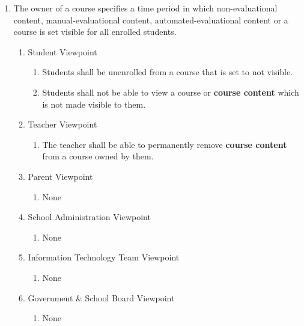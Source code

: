 \documentclass[]{article}
\begin{document}
\begin{enumerate}[{BE}1.]
\begin{enumerate}[{VP2}.1]
	\end{enumerate}

  \item The owner of a course specifies a time period in which non-evaluational
    content, manual-evaluational content, automated-evaluational content or a
    course is set visible for all enrolled students.
	\begin{enumerate}[{VP2}.1]

		\item Student Viewpoint
			\begin{enumerate}
        \item Students shall be unenrolled from a course that is set to not
          visible.

        \item Students shall not be able to view a course or
          \textbf{course content} which is not made visible to them.
			\end{enumerate}

		\item Teacher Viewpoint
			\begin{enumerate}
        \item The teacher shall be able to permanently remove \textbf{course
          content} from a course owned by them.
			\end{enumerate}

		\item Parent Viewpoint
			\begin{enumerate}
				\item None
			\end{enumerate}

		\item School Administration Viewpoint
			\begin{enumerate}
				\item None
			\end{enumerate}

		\item Information Technology Team Viewpoint
			\begin{enumerate}
				\item None
			\end{enumerate}

		\item Government \& School Board Viewpoint
			\begin{enumerate}
				\item None
			\end{enumerate}
	\end{enumerate}


\end{enumerate}
\end{document}

